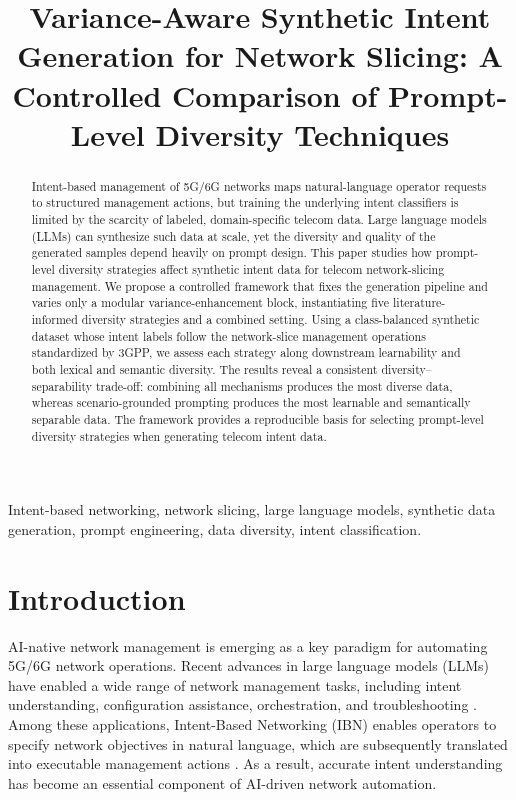 \documentclass[conference]{IEEEtran}
\begin{document}
\title{Variance-Aware Synthetic Intent Generation for Network Slicing: A Controlled Comparison of Prompt-Level Diversity Techniques}

\author{
}

\maketitle

\begin{abstract}
Intent-based management of 5G/6G networks maps natural-language operator requests to structured management actions, but training the underlying intent classifiers is limited by the scarcity of labeled, domain-specific telecom data. Large language models (LLMs) can synthesize such data at scale, yet the diversity and quality of the generated samples depend heavily on prompt design. This paper studies how prompt-level diversity strategies affect synthetic intent data for telecom network-slicing management. We propose a controlled framework that fixes the generation pipeline and varies only a modular variance-enhancement block, instantiating five literature-informed diversity strategies and a combined setting. Using a class-balanced synthetic dataset whose intent labels follow the network-slice management operations standardized by 3GPP, we assess each strategy along downstream learnability and both lexical and semantic diversity. The results reveal a consistent diversity--separability trade-off: combining all mechanisms produces the most diverse data, whereas scenario-grounded prompting produces the most learnable and semantically separable data. The framework provides a reproducible basis for selecting prompt-level diversity strategies when generating telecom intent data.
\end{abstract}

\begin{IEEEkeywords}
Intent-based networking, network slicing, large language models, synthetic data generation, prompt engineering, data diversity, intent classification.
\end{IEEEkeywords}

\section{Introduction}
\label{sec:intro}
AI-native network management is emerging as a key paradigm for automating 5G/6G network operations. Recent advances in large language models (LLMs) have enabled a wide range of network management tasks, including intent understanding, configuration assistance, orchestration, and troubleshooting \cite{bariahLLM}. Among these applications, Intent-Based Networking (IBN) enables operators to specify network objectives in natural language, which are subsequently translated into executable management actions \cite{mekracheIBN}. As a result, accurate intent understanding has become an essential component of AI-driven network automation.
\end{document}
